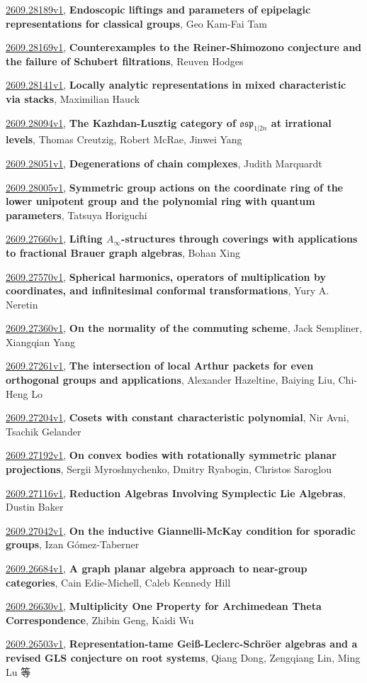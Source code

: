 \documentclass[9pt, a4paper]{article}
\theoremstyle{plain}
\theoremstyle{definition}
\theoremstyle{remark}
\newcommand{\arxiv}[3]{\href{https://arxiv.org/abs/#1}{#1}, \textbf{\textcolor{arxivblue}{#2}}, #3}
\begin{document}
\arxiv{2609.28189v1}{Endoscopic liftings and parameters of epipelagic representations for classical groups}{Geo Kam-Fai Tam}

\arxiv{2609.28169v1}{Counterexamples to the Reiner-Shimozono conjecture and the failure of Schubert filtrations}{Reuven Hodges}

\arxiv{2609.28141v1}{Locally analytic representations in mixed characteristic via stacks}{Maximilian Hauck}

\arxiv{2609.28094v1}{The Kazhdan-Lusztig category of $\mathfrak{osp}_{1|2n}$ at irrational levels}{Thomas Creutzig, Robert McRae, Jinwei Yang}

\arxiv{2609.28051v1}{Degenerations of chain complexes}{Judith Marquardt}

\arxiv{2609.28005v1}{Symmetric group actions on the coordinate ring of the lower unipotent group and the polynomial ring with quantum parameters}{Tatsuya Horiguchi}

\arxiv{2609.27660v1}{Lifting $A_\infty$-structures through coverings with applications to fractional Brauer graph algebras}{Bohan Xing}

\arxiv{2609.27570v1}{Spherical harmonics, operators of multiplication by coordinates, and infinitesimal conformal transformations}{Yury A. Neretin}

\arxiv{2609.27360v1}{On the normality of the commuting scheme}{Jack Sempliner, Xiangqian Yang}

\arxiv{2609.27261v1}{The intersection of local Arthur packets for even orthogonal groups and applications}{Alexander Hazeltine, Baiying Liu, Chi-Heng Lo}

\arxiv{2609.27204v1}{Cosets with constant characteristic polynomial}{Nir Avni, Tsachik Gelander}

\arxiv{2609.27192v1}{On convex bodies with rotationally symmetric planar projections}{Sergii Myroshnychenko, Dmitry Ryabogin, Christos Saroglou}

\arxiv{2609.27116v1}{Reduction Algebras Involving Symplectic Lie Algebras}{Dustin Baker}

\arxiv{2609.27042v1}{On the inductive Giannelli-McKay condition for sporadic groups}{Izan Gómez-Taberner}

\arxiv{2609.26684v1}{A graph planar algebra approach to near-group categories}{Cain Edie-Michell, Caleb Kennedy Hill}

\arxiv{2609.26630v1}{Multiplicity One Property for Archimedean Theta Correspondence}{Zhibin Geng, Kaidi Wu}

\arxiv{2609.26503v1}{Representation-tame Geiß-Leclerc-Schröer algebras and a revised GLS conjecture on root systems}{Qiang Dong, Zengqiang Lin, Ming Lu 等}
\end{document}

